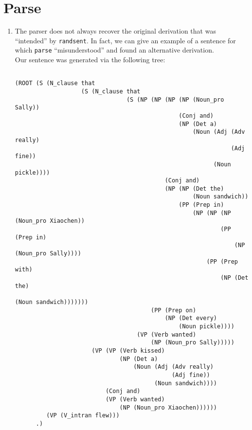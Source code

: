\documentclass[11pt]{article}
\newcommand{\code}[1]{\texttt{#1}}
\begin{document}
\section{Parse}
\begin{enumerate}
\item
	The parser does not always recover the original derivation that was ``intended'' by \code{randsent}. In fact, we can give an example of a sentence for which \code{parse} ``misunderstood'' and found an alternative derivation. \vspace{4pt} \\
	Our sentence was generated via the following tree:
	\begin{lstlisting}
	
(ROOT (S (N_clause that 
                   (S (N_clause that 
                                (S (NP (NP (NP (NP (Noun_pro Sally))                      
                                               (Conj and)                                 
                                               (NP (Det a) 
                                                   (Noun (Adj (Adv really)                
                                                              (Adj fine))                 
                                                         (Noun pickle))))                 
                                           (Conj and) 
                                           (NP (NP (Det the) 
                                                   (Noun sandwich))                       
                                               (PP (Prep in) 
                                                   (NP (NP (NP (Noun_pro Xiaochen))       
                                                           (PP (Prep in) 
                                                               (NP (Noun_pro Sally))))    
                                                       (PP (Prep with) 
                                                           (NP (Det the) 
                                                               (Noun sandwich)))))))      
                                       (PP (Prep on) 
                                           (NP (Det every) 
                                               (Noun pickle))))                           
                                   (VP (Verb wanted) 
                                       (NP (Noun_pro Sally)))))                           
                      (VP (VP (Verb kissed)                                               
                              (NP (Det a) 
                                  (Noun (Adj (Adv really)                                 
                                             (Adj fine)) 
                                        (Noun sandwich))))                                
                          (Conj and) 
                          (VP (Verb wanted) 
                              (NP (Noun_pro Xiaochen))))))                                
         (VP (V_intran flew)))                                                            
      .)
      

\end{lstlisting}
\end{enumerate}
\end{document}
